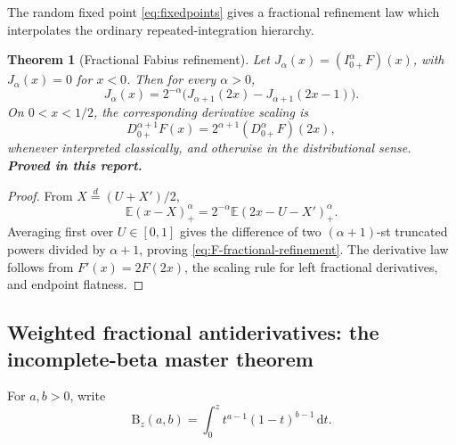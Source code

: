 \documentclass[11pt,oneside]{article}
\numberwithin{equation}{section}
\newtheorem{theorem}{Theorem}[section]
\theoremstyle{definition}
\theoremstyle{remark}
\newcommand{\dd}{\,\mathrm d}
\newcommand{\E}{\mathbb E}
\newcommand{\statusproved}{\textcolor{proofgreen}{\textbf{Proved in this report.}}}
\begin{document}
The random fixed point \eqref{eq:fixedpoints} gives a fractional refinement law
which interpolates the ordinary repeated-integration hierarchy.

\begin{theorem}[Fractional Fabius refinement]
\label{thm:F-fractional-refinement}
Let \(J_\alpha(x)=(I_{0+}^{\alpha}F)(x)\), with \(J_\alpha(x)=0\) for
\(x<0\).  Then for every \(\alpha>0\),
\begin{equation}
 \boxed{
 J_\alpha(x)=2^{-\alpha}
 \bigl(J_{\alpha+1}(2x)-J_{\alpha+1}(2x-1)\bigr).}
 \label{eq:F-fractional-refinement}
\end{equation}
On \(0<x<1/2\), the corresponding derivative scaling is
\begin{equation}
 D_{0+}^{\alpha+1}F(x)
 =2^{\alpha+1}(D_{0+}^{\alpha}F)(2x),
 \label{eq:F-fractional-derivative-scaling}
\end{equation}
whenever interpreted classically, and otherwise in the distributional sense.
\statusproved
\end{theorem}

\begin{proof}
From \(X\stackrel d=(U+X')/2\),
\[
 \E(x-X)_+^\alpha
 =2^{-\alpha}\E(2x-U-X')_+^\alpha.
\]
Averaging first over \(U\in[0,1]\) gives the difference of two
\((\alpha+1)\)-st truncated powers divided by \(\alpha+1\), proving
\eqref{eq:F-fractional-refinement}.  The derivative law follows from
\(F'(x)=2F(2x)\), the scaling rule for left fractional derivatives, and endpoint
flatness.
\end{proof}

\subsection{Weighted fractional antiderivatives: the incomplete-beta master theorem}

For \(a,b>0\), write
\begin{equation}
 \mathrm B_z(a,b)=\int_0^z t^{a-1}(1-t)^{b-1}\dd t.
 \label{eq:incomplete-beta}
\end{equation}
\end{document}
